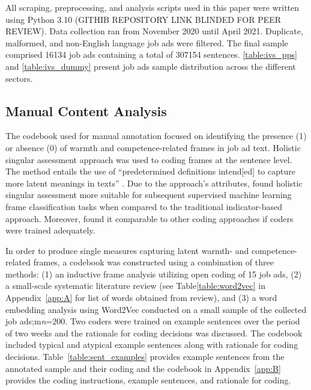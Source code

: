 \documentclass[man]{apa7}
\begin{document}
All scraping, preprocessing, and analysis scripts used in this paper were written using Python 3.10 (GITHIB REPOSITORY LINK BLINDED FOR PEER REVIEW). Data collection ran from November 2020 until April 2021. Duplicate, malformed, and non-English language job ads were filtered. The final sample comprised 16134 job ads containing a total of 307154 sentences. \ref{table:ivs_pps} and \ref{table:ivs_dummy} present job ads sample distribution across the different sectors.

\subsection{Manual Content Analysis}
\label{ca}
The codebook used for manual annotation focused on identifying the presence (1) or absence (0) of warmth and competence-related frames in job ad text. Holistic singular assessment approach was used to coding frames at the sentence level. The method entails the use of “predetermined definitions intend[ed] to capture more latent meanings in texts” \parencite[p. 332]{wright_framework_2011}. Due to the approach’s attributes, \Textcite{burscher_teaching_2014} found holistic singular assessment more suitable for subsequent supervised machine learning frame classification tasks when compared to the traditional indicator-based approach. Moreover, \Textcite{wright_framework_2011} found it comparable to other coding approaches if coders were trained adequately.

In order to produce single measures capturing latent warmth- and competence-related frames, a codebook was constructed using a combination of three methods: (1) an inductive frame analysis utilizing open coding of 15 job ads, (2) a small-scale systematic literature review (see Table\ref{table:word2vec} in Appendix~\ref{app:A} for list of words obtained from review), and (3) a word embedding analysis using Word2Vec conducted on a small sample of the collected job ads;m\textit{n}=200. Two coders were trained on example sentences over the period of two weeks and the rationale for coding decisions was discussed. The codebook included typical and atypical example sentences along with rationale for coding decisions. Table~\ref{table:sent_examples} provides example sentences from the annotated sample and their coding and the codebook in Appendix~\ref{app:B} provides the coding instructions, example sentences, and rationale for coding.
\end{document}
